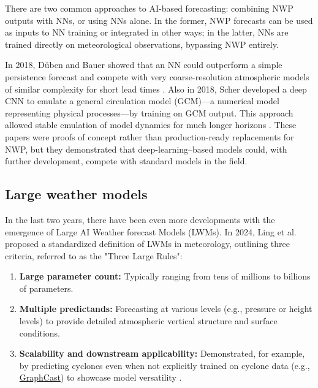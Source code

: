 There are two common approaches to AI-based forecasting: combining NWP outputs with NNs, or using NNs alone. In the former, NWP forecasts can be used as inputs to NN training or integrated in other ways; in the latter, NNs are trained directly on meteorological observations, bypassing NWP entirely.

In 2018, Düben and Bauer showed that an NN could outperform a simple persistence forecast and compete with very coarse-resolution atmospheric models of similar complexity for short lead times \cite{dueben2018}. Also in 2018, Scher developed a deep CNN to emulate a general circulation model (GCM)—a numerical model representing physical processes—by training on GCM output. This approach allowed stable emulation of model dynamics for much longer horizons \cite{scher2018}. These papers were proofs of concept rather than production-ready replacements for NWP, but they demonstrated that deep-learning–based models could, with further development, compete with standard models in the field.

\subsection{Large weather models}
In the last two years, there have been even more developments with the emergence of Large AI Weather forecast Models (LWMs). In 2024, Ling et al.\ \cite{SecondRevolution} proposed a standardized definition of LWMs in meteorology, outlining three criteria, referred to as the "Three Large Rules":

\begin{enumerate}[label=\textbf{\arabic*}.,rightmargin=1.5em]
  \item \textbf{Large parameter count:} Typically ranging from tens of millions to billions of parameters.
  \item \textbf{Multiple predictands:} Forecasting at various levels (e.g., pressure or height levels) to provide detailed atmospheric vertical structure and surface conditions.
  \item \textbf{Scalability and downstream applicability:} Demonstrated, for example, by predicting cyclones even when not explicitly trained on cyclone data (e.g., \href{https://www.youtube.com/watch?v=PD1v5PCJs_o&ab_channel=GregBronevetsky}{GraphCast}) to showcase model versatility \cite{SecondRevolution}.
\end{enumerate}

